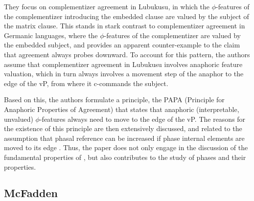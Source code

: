\documentclass[output=paper
,modfonts
,nonflat]{langsci/langscibook}
\begin{document}
They focus on complementizer agreement in Lubukusu, in which the $\phi$-fea\-tures of the complementizer introducing the embedded clause are valued by the subject of the matrix clause. This stands in stark contrast to complementizer agreement in Germanic languages, where the  $\phi$-features of the complementizer are valued by the embedded subject, and provides an apparent counter-example to the claim that agreement always probes downward. To account for this pattern, the authors assume that complementizer agreement in Lubukusu involves anaphoric feature valuation, which in turn always involves a movement step of the anaphor to the edge of the vP, from where it c-commands the subject.

Based on this, the authors formulate a principle, the PAPA (Principle for Anaphoric Properties of Agreement) that states that anaphoric (interpretable, unvalued) $\phi$-features always need to move to the edge of the vP. The reasons for the existence of this principle are then extensively discussed, and related to the assumption that phasal reference can be increased if phase internal elements are moved to its edge \citep{HinzenSheehan2013}. Thus, the paper does not only engage in the discussion of the fundamental properties of \agr{}, but also contributes to the study of phases and their properties.


\subsection{McFadden}
\label{sec:mcfadden}
\end{document}
